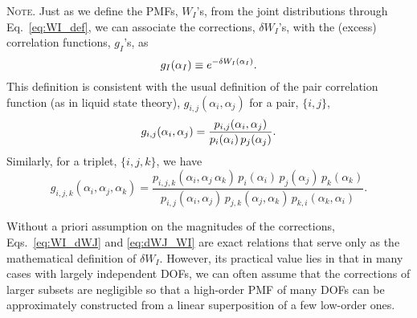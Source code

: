 \documentclass[preprint, superscriptaddress]{revtex4-1}
\newcommand{\note}[1]{{\color{DarkGreen}\footnotesize \textsc{Note.} #1}}
\begin{document}

\note{
Just as we define the PMFs, $W_I$'s, from the joint distributions
through Eq.~\eqref{eq:WI_def},
we can associate the corrections, $\delta W_I$'s,
with the (excess) correlation functions, $g_I$'s, as
%
\begin{equation}
  g_I(\alpha_I) \equiv e^{-\delta W_I(\alpha_I)}
  .
  \notag
\end{equation}
%
This definition is consistent with the usual definition
of the pair correlation function (as in liquid state theory\cite{hansen}),
$g_{i,j}(\alpha_i, \alpha_j)$ for a pair, $\{i, j\}$,
\begin{equation}
  g_{i,j}(\alpha_i, \alpha_j)
  =
  \frac{ p_{i,j}(\alpha_i, \alpha_j) } { p_i(\alpha_i) \, p_j(\alpha_j) }
  .
  \notag
\end{equation}
Similarly, for a triplet, $\{i, j, k\}$, we have
$$
g_{i,j,k}(\alpha_i, \alpha_j, \alpha_k)
=
\frac{ p_{i,j,k}(\alpha_i, \alpha_j \, \alpha_k) \, p_i(\alpha_i) \, p_j(\alpha_j) \, p_k(\alpha_k) }{ p_{i,j}(\alpha_i, \alpha_j) \, p_{j,k}(\alpha_j, \alpha_k) \, p_{k,i}(\alpha_k, \alpha_i) }
.
$$
}



Without a priori assumption on the magnitudes of the corrections,
Eqs.~\eqref{eq:WI_dWJ} and \eqref{eq:dWJ_WI} are exact relations
that serve only as the mathematical definition of $\delta W_I$.
%
However, its practical value lies in that in many cases
with largely independent DOFs,
we can often assume
that the corrections of larger subsets are negligible
so that a high-order PMF of many DOFs can be approximately constructed
from a linear superposition of a few low-order ones.
\end{document}
